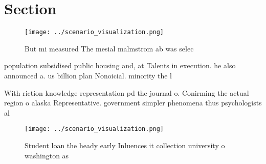 \documentclass[a4paper]{article}
\begin{document}
\section{Section}

\begin{figure}
\centering
\texttt{[image: ../scenario\_visualization.png]}
\caption{But mi measured The mesial malmstrom ab was selec
}
\end{figure}
 
population subsidised public housing and, at Talents in execution. he also announced a. us billion plan Nonoicial. minority the l

With riction knowledge representation pd the journal o. Conirming the actual region o alaska Representative. government simpler phenomena thus psychologists al

\begin{figure}
\centering
\texttt{[image: ../scenario\_visualization.png]}
\caption{Student loan the heady early Inluences it collection university o washington as
}
\end{figure}
 
\end{document}
